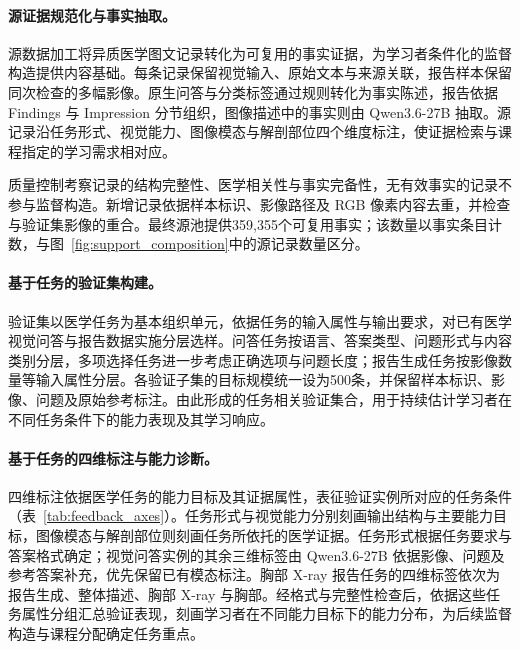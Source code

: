 \begin{samepage}
\paragraph{源证据规范化与事实抽取。}
\label{app:data_preparation}
源数据加工将异质医学图文记录转化为可复用的事实证据，为学习者条件化的监督构造提供内容基础。每条记录保留视觉输入、原始文本与来源关联，报告样本保留同次检查的多幅影像。原生问答与分类标签通过规则转化为事实陈述，报告依据 Findings 与 Impression 分节组织，图像描述中的事实则由 Qwen3.6-27B 抽取。源记录沿任务形式、视觉能力、图像模态与解剖部位四个维度标注，使证据检索与课程指定的学习需求相对应。

质量控制考察记录的结构完整性、医学相关性与事实完备性，无有效事实的记录不参与监督构造。新增记录依据样本标识、影像路径及 RGB 像素内容去重，并检查与验证集影像的重合。最终源池提供359,355个可复用事实；该数量以事实条目计数，与图~\ref{fig:support_composition}中的源记录数量区分。

\par
\end{samepage}

\paragraph{基于任务的验证集构建。}
验证集以医学任务为基本组织单元，依据任务的输入属性与输出要求，对已有医学视觉问答与报告数据实施分层选样。问答任务按语言、答案类型、问题形式与内容类别分层，多项选择任务进一步考虑正确选项与问题长度；报告生成任务按影像数量等输入属性分层。各验证子集的目标规模统一设为500条，并保留样本标识、影像、问题及原始参考标注。由此形成的任务相关验证集合，用于持续估计学习者在不同任务条件下的能力表现及其学习响应。

\paragraph{基于任务的四维标注与能力诊断。}
四维标注依据医学任务的能力目标及其证据属性，表征验证实例所对应的任务条件（表~\ref{tab:feedback_axes}）。任务形式与视觉能力分别刻画输出结构与主要能力目标，图像模态与解剖部位则刻画任务所依托的医学证据。任务形式根据任务要求与答案格式确定；视觉问答实例的其余三维标签由 Qwen3.6-27B 依据影像、问题及参考答案补充，优先保留已有模态标注。胸部 X-ray 报告任务的四维标签依次为报告生成、整体描述、胸部 X-ray 与胸部。经格式与完整性检查后，依据这些任务属性分组汇总验证表现，刻画学习者在不同能力目标下的能力分布，为后续监督构造与课程分配确定任务重点。

